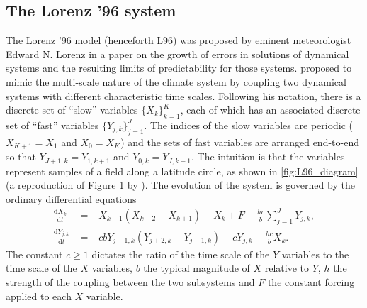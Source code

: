 \documentclass[titlepage,twoside]{article}
\numberwithin{equation}{section}
\newcommand{\diff}[2]{\frac{\mathrm{d} #1}{\mathrm{d} #2}}
\begin{document}
\subsection{The Lorenz '96 system}
The Lorenz '96 model (henceforth L96) was proposed by eminent meteorologist
Edward N. Lorenz in a \citeyear{lorenz1995} paper \parencite{lorenz1995} on the
growth of errors in solutions of dynamical systems and the resulting limits of
predictability for those systems. \citeauthor{lorenz1995} proposed to mimic the
multi-scale nature of the climate system by coupling two dynamical systems with
different characteristic time scales. Following his notation, there is a
discrete set of ``slow'' variables $\{X_k\}_{k=1}^K$, each of which has an
associated discrete set of ``fast'' variables $\{Y_{j,k}\}_{j=1}^J$. The
indices of the slow variables are periodic ($X_{K+1} = X_1$ and $X_0 = X_K$)
and the sets of fast variables are arranged end-to-end so that $Y_{J+1,k} =
Y_{1,k+1}$ and $Y_{0,k} = Y_{J,k-1}$. The intuition is that the variables
represent samples of a field along a latitude circle, as shown in
\cref{fig:L96_diagram} (a reproduction of Figure 1 by \textcite{russell2017}).
The evolution of the system is governed by the ordinary differential equations
\begin{subequations} \label{eqn:l96}
\begin{align}
    \diff{X_k}{t}
        &= -X_{k-1} (X_{k-2} - X_{k+1}) - X_k + F
        - \frac{hc}{b} \sum_{j=1}^J Y_{j,k}, \\
    \diff{Y_{j,k}}{t}
        &= -cb Y_{j+1,k} (Y_{j+2,k} - Y_{j-1,k}) - c Y_{j,k}
        + \frac{hc}{b} X_k.
\end{align}
\end{subequations}
The constant $c \geq 1$ dictates the ratio of the time scale of the $Y$
variables to the time scale of the $X$ variables, $b$ the typical
magnitude of $X$ relative to $Y$, $h$ the strength of the coupling
between the two subsystems and $F$ the constant forcing applied to each
$X$ variable.
\end{document}
